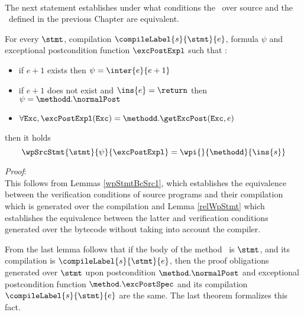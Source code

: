 \Qed \\


 

 

The next statement establishes under what conditions
 the \wpName \  over source and the \wpName \ defined in the previous Chapter are equivalent.

\begin{wpStmtBcSrc2} \label{wpStmtBcSrc2}
For every $\stmt$, compilation $\compileLabel{s}{\stmt}{e}$,  formula $\psi$ and 
   exceptional postcondition  function $\excPostExpl $ such that :
 
  \begin{itemize}
         \item if $e + 1$ exists then  $\psi = \inter{e}{e+1}$
	 \item if $e+1$ does not exist and $\ins{e} = \return$  then $\psi = \methodd.\normalPost$
	 \item$\forall \mbox{\rm\texttt{Exc}} ,  \excPostExpl( \mbox{\rm\texttt{Exc}} ) = \methodd.\getExcPost(\mbox{\rm\texttt{Exc}}, e) $ 
  \end{itemize}
      then it holds 
$$ \wpSrcStmt{\stmt}{\psi }{\excPostExpl }  = \wpi{}{\methodd}{\ins{s} }$$
\end{wpStmtBcSrc2}
\textit{Proof}: \\
This follows from Lemmas \ref{wpStmtBcSrc1}, which establishes the equivalence between the verification conditions of
 source programs  and their compilation which is generated over the compilation and  Lemma \ref{relWpStmt}  which establishes 
the equivalence between the latter and verification conditions generated over the bytecode without taking into account the compiler.\\
\Qed


From the last lemma follows that if the body of the  method \methodd \ is $\stmt$, and its compilation is $\compileLabel{s}{\stmt}{e}$, then 
the proof obligations generated over $\stmt$ upon postcondition $\method.\normalPost$ and exceptional
postcondition function  $\method.\excPostSpec$     and its compilation $\compileLabel{s}{\stmt}{e}$ are the same. The last theorem 
formalizes this fact.

